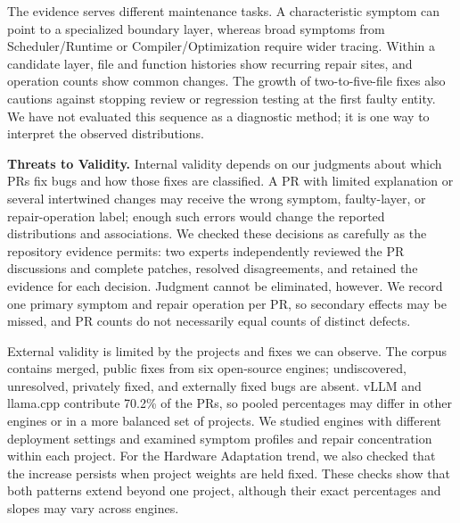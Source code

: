 The evidence serves different maintenance tasks. A characteristic symptom can point to a specialized boundary layer, whereas broad symptoms from Scheduler/Runtime or Compiler/Optimization require wider tracing. Within a candidate layer, file and function histories show recurring repair sites, and operation counts show common changes. The growth of two-to-five-file fixes also cautions against stopping review or regression testing at the first faulty entity. We have not evaluated this sequence as a diagnostic method; it is one way to interpret the observed distributions.

\noindent\textbf{Threats to Validity.}
Internal validity depends on our judgments about which PRs fix bugs and how those fixes are classified. A PR with limited explanation or several intertwined changes may receive the wrong symptom, faulty-layer, or repair-operation label; enough such errors would change the reported distributions and associations. We checked these decisions as carefully as the repository evidence permits: two experts independently reviewed the PR discussions and complete patches, resolved disagreements, and retained the evidence for each decision. Judgment cannot be eliminated, however. We record one primary symptom and repair operation per PR, so secondary effects may be missed, and PR counts do not necessarily equal counts of distinct defects.

External validity is limited by the projects and fixes we can observe. The corpus contains merged, public fixes from six open-source engines; undiscovered, unresolved, privately fixed, and externally fixed bugs are absent. vLLM and llama.cpp contribute 70.2\% of the PRs, so pooled percentages may differ in other engines or in a more balanced set of projects. We studied engines with different deployment settings and examined symptom profiles and repair concentration within each project. For the Hardware Adaptation trend, we also checked that the increase persists when project weights are held fixed. These checks show that both patterns extend beyond one project, although their exact percentages and slopes may vary across engines.

